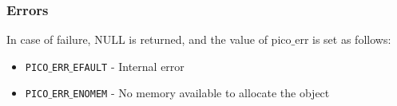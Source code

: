 \subsubsection*{Errors}
In case of failure, NULL is returned, and the value of pico$\_$err
is set as follows:

\begin{itemize}[noitemsep]
\item \texttt{PICO$\_$ERR$\_$EFAULT}          - Internal error
\item \texttt{PICO$\_$ERR$\_$ENOMEM}          - No memory available to allocate the object
\end{itemize}


